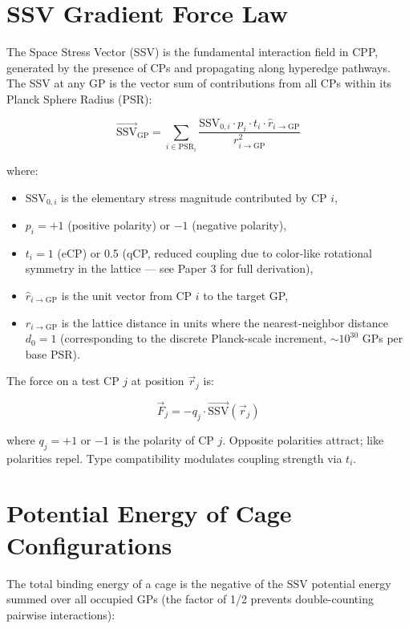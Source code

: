 \documentclass[11pt]{article}
\begin{document}
\section{SSV Gradient Force Law}

The Space Stress Vector (SSV) is the fundamental interaction field in CPP, generated by the presence of CPs and propagating along hyperedge pathways. The SSV at any GP is the vector sum of contributions from all CPs within its Planck Sphere Radius (PSR):

\begin{equation}
\vec{\text{SSV}}_{\text{GP}} = \sum_{i \in \text{PSR}_i} \frac{\text{SSV}_{0,i} \cdot p_i \cdot t_i \cdot \hat{r}_{i \to \text{GP}}}{r_{i \to \text{GP}}^2}
\label{eq:ssv_field}
\end{equation}

where:
\begin{itemize}
    \item $\text{SSV}_{0,i}$ is the elementary stress magnitude contributed by CP $i$,
    \item $p_i = +1$ (positive polarity) or $-1$ (negative polarity),
    \item $t_i = 1$ (eCP) or 0.5 (qCP, reduced coupling due to color-like rotational symmetry in the lattice — see Paper 3 for full derivation),
    \item $\hat{r}_{i \to \text{GP}}$ is the unit vector from CP $i$ to the target GP,
    \item $r_{i \to \text{GP}}$ is the lattice distance in units where the nearest-neighbor distance $d_0 = 1$ (corresponding to the discrete Planck-scale increment, $\sim 10^{30}$ GPs per base PSR).
\end{itemize}

The force on a test CP $j$ at position $\vec{r}_j$ is:

\begin{equation}
\vec{F}_j = -q_j \cdot \vec{\text{SSV}}(\vec{r}_j)
\label{eq:force_law}
\end{equation}

where $q_j = +1$ or $-1$ is the polarity of CP $j$. Opposite polarities attract; like polarities repel. Type compatibility modulates coupling strength via $t_i$.

\section{Potential Energy of Cage Configurations}

The total binding energy of a cage is the negative of the SSV potential energy summed over all occupied GPs (the factor of 1/2 prevents double-counting pairwise interactions):
\end{document}
